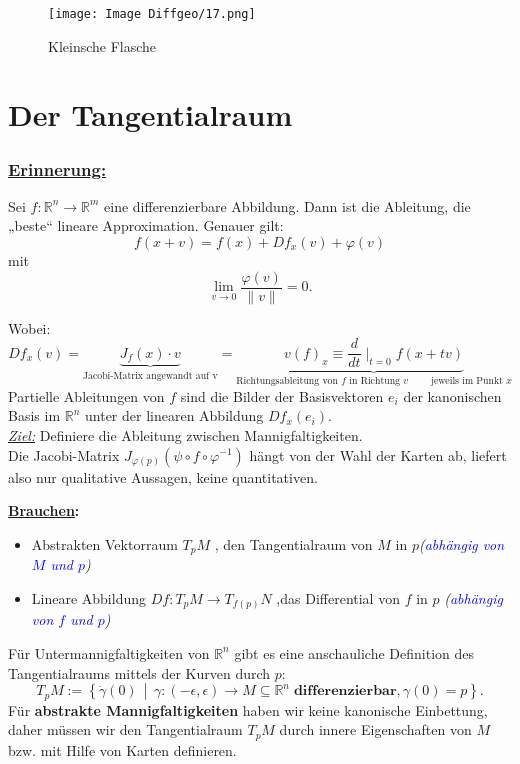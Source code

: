 \documentclass[fleqn, 12pt, letterpaper]{article}
\newcommand{\txt}[1]{\text{#1}}
\begin{document}
\begin{figure}[H]
  \centering
  \texttt{[image: Image Diffgeo/17.png]}
\caption{Kleinsche Flasche}
\end{figure}

\section{Der Tangentialraum}

\subsubsection*{\underline{Erinnerung:}} Sei \( f: \mathbb{R}^n \rightarrow \mathbb{R}^m \) eine differenzierbare Abbildung. Dann ist die Ableitung, die „beste“ lineare Approximation. Genauer gilt:
\[
f(x + v) = f(x) + Df_x(v) + \varphi(v)
\]
mit
\[
\lim_{v \to 0} \frac{\varphi(v)}{\|v\|} = 0.
\]

\medskip

Wobei:
\[Df_x(v) = \underbrace{J_f(x)\cdot v }_{\txt{Jacobi-Matrix angewandt auf v}} = \underbrace{v(f)_x\equiv \frac{d}{dt}\mid_{t=0}f(x+tv)}_{\text{Richtungsableitung von } f \text{ in Richtung } v \qquad \text{ jeweils im Punkt } x} 
\]
Partielle Ableitungen von \( f \) sind die Bilder der Basisvektoren \( e_i \) der kanonischen Basis im \( \mathbb{R}^n \) unter der linearen Abbildung \( Df_x(e_i)\).\\

\textit{\underline{Ziel:}} Definiere die Ableitung zwischen Mannigfaltigkeiten.\\

Die Jacobi-Matrix \( J_{\varphi(p)} (\psi \circ f \circ \varphi^{-1}) \) hängt von der Wahl der Karten ab, liefert also nur qualitative Aussagen, keine quantitativen.

\medskip

\textbf{\underline{Brauchen}:} \begin{itemize}
  \item Abstrakten Vektorraum $T_pM$ , den Tangentialraum von \( M \) in \( p \)\hfill \textit{(\textcolor{blue}{abhängig von \( M \) und \( p \)})}
  \item Lineare Abbildung $Df: T_pM \to T_{f(p)}N$ ,das Differential von \( f \) in \( p \) \hfill \textit{(\textcolor{blue}{abhängig von \( f \) und \( p \)})}
\end{itemize}

\medskip

Für Untermannigfaltigkeiten von \( \mathbb{R}^n \) gibt es eine anschauliche Definition des Tangentialraums mittels der Kurven durch \( p \):
\[
T_p M := \left\{ \dot{\gamma}(0) \,\middle|\, \gamma : (-\epsilon,\epsilon)\to M\subseteq \mathbb{R}^n \;\textbf{differenzierbar}, \gamma(0) = p \right\}.
\]
Für \textbf{abstrakte Mannigfaltigkeiten} haben wir keine kanonische Einbettung, daher müssen wir den Tangentialraum \( T_p M \) 
durch innere Eigenschaften von \( M \) bzw. mit Hilfe von Karten definieren.
\end{document}
